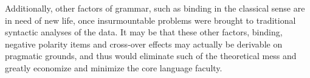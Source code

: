 \documentclass{article}
\begin{document}
Additionally, other factors of grammar, such as binding in the classical sense are in need of new life, once insurmountable problems were brought to traditional syntactic analyses of the data. It may be that these other factors, binding, negative polarity items and cross-over effects may actually be derivable on pragmatic grounds, and thus would eliminate such of the theoretical mess and greatly economize and minimize the core language faculty.

\printbibliography
\end{document}
